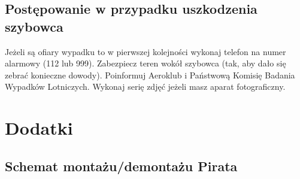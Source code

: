 \documentclass{article}
\begin{document}
\subsection{Postępowanie w przypadku uszkodzenia szybowca}
Jeżeli są ofiary wypadku to w pierwszej kolejności wykonaj telefon na numer
alarmowy (112 lub 999). Zabezpiecz teren wokół szybowca (tak, aby dało się
zebrać konieczne dowody). Poinformuj Aeroklub i Państwową Komisię Badania
Wypadków Lotniczych. Wykonaj serię zdjęć jeżeli masz aparat fotograficzny.

\newpage
\section{Dodatki}
\subsection{Schemat montażu/demontażu Pirata}
\end{document}
